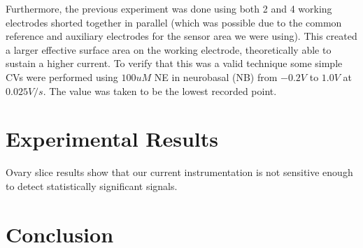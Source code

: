 \documentclass[twocolumn]{article}
\begin{document}
Furthermore, the previous experiment was done using both 2 and 4 working electrodes shorted together in parallel (which was possible due to the common reference and auxiliary electrodes for the sensor area we were using). This created a larger effective surface area on the working electrode, theoretically able to sustain a higher current. To verify that this was a valid technique some simple CVs were performed using $100uM$ NE in neurobasal (NB) from $-0.2V$ to $1.0V$ at $0.025V/s$. The value was taken to be the lowest recorded point.

\section{Experimental Results}

Ovary slice results show that our current instrumentation is not sensitive enough to detect statistically significant signals.

\section{Conclusion}

\end{document}
